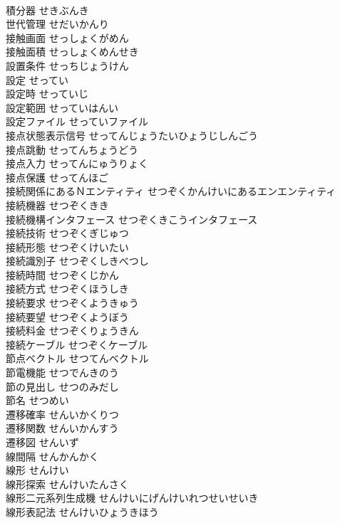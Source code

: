 \documentclass[8pt]{extreport}
\begin{document}
\begin{CJK}{UTF8}{min}
\\	積分器	せきぶんき	
\\	世代管理	せだいかんり	
\\	接触画面	せっしょくがめん	
\\	接触面積	せっしょくめんせき	
\\	設置条件	せっちじょうけん	
\\	設定	せってい	
\\	設定時	せっていじ	
\\	設定範囲	せっていはんい	
\\	設定ファイル	せっていファイル	
\\	接点状態表示信号	せってんじょうたいひょうじしんごう	
\\	接点跳動	せってんちょうどう	
\\	接点入力	せってんにゅうりょく	
\\	接点保護	せってんほご	
\\	接続関係にあるＮエンティティ	せつぞくかんけいにあるエンエンティティ	
\\	接続機器	せつぞくきき	
\\	接続機構インタフェース	せつぞくきこうインタフェース	
\\	接続技術	せつぞくぎじゅつ	
\\	接続形態	せつぞくけいたい	
\\	接続識別子	せつぞくしきべつし	
\\	接続時間	せつぞくじかん	
\\	接続方式	せつぞくほうしき	
\\	接続要求	せつぞくようきゅう	
\\	接続要望	せつぞくようぼう	
\\	接続料金	せつぞくりょうきん	
\\	接続ケーブル	せつぞくケーブル	
\\	節点ベクトル	せつてんベクトル	
\\	節電機能	せつでんきのう	
\\	節の見出し	せつのみだし	
\\	節名	せつめい	
\\	遷移確率	せんいかくりつ	
\\	遷移関数	せんいかんすう	
\\	遷移図	せんいず	
\\	線間隔	せんかんかく	
\\	線形	せんけい	
\\	線形探索	せんけいたんさく	
\\	線形二元系列生成機	せんけいにげんけいれつせいせいき	
\\	線形表記法	せんけいひょうきほう	

\end{CJK}
\end{document}
